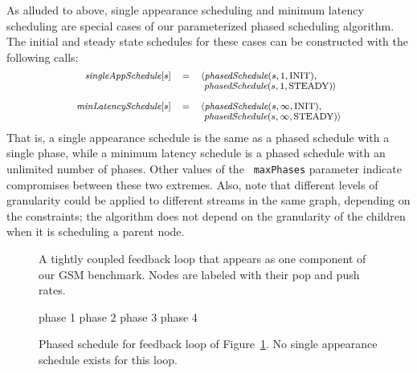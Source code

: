 As alluded to above, single appearance scheduling and minimum latency
scheduling are special cases of our parameterized phased scheduling
algorithm.  The initial and steady state schedules for these cases can
be constructed with the following calls:
\[
\small
\begin{array}{rcl}
\mt{singleAppSchedule}[s]  & = & \langle \mt{phasedSchedule}(s, 1, \mbox{INIT}), \\
                         ~ & ~ & ~ \mt{phasedSchedule}(s, 1, \mbox{STEADY}) \rangle \\ ~ \\
\mt{minLatencySchedule}[s] & = & \langle \mt{phasedSchedule}(s, \infty, \mbox{INIT}), \\
                         ~ & ~ & ~ \mt{phasedSchedule}(s, \infty, \mbox{STEADY}) \rangle
\end{array}
\]
That is, a single appearance schedule is the same as a phased schedule
with a single phase, while a minimum latency schedule is a phased
schedule with an unlimited number of phases.  Other values of the {\tt
maxPhases} parameter indicate compromises between these two extremes.
Also, note that different levels of granularity could be applied to
different streams in the same graph, depending on the constraints; the
algorithm does not depend on the granularity of the children when it
is scheduling a parent node.

\begin{figure}[t]
\begin{center}
\caption{\small A tightly coupled feedback loop that appears as one component
of our GSM benchmark.  Nodes are labeled with their pop and push
rates.  \protect\label{fig:gsm}}
\end{center}
\vspace{-12pt}
\end{figure}

\begin{figure*}[t]

\hspace{43pt} 
phase 1 \hspace{94pt}
phase 2 \hspace{94pt}
phase 3 \hspace{94pt}
phase 4
\caption{\small Phased schedule for feedback loop of Figure~\ref{fig:gsm}.
No single appearance schedule exists for this
loop.\protect\label{fig:gsm-phases}}
\end{figure*}


